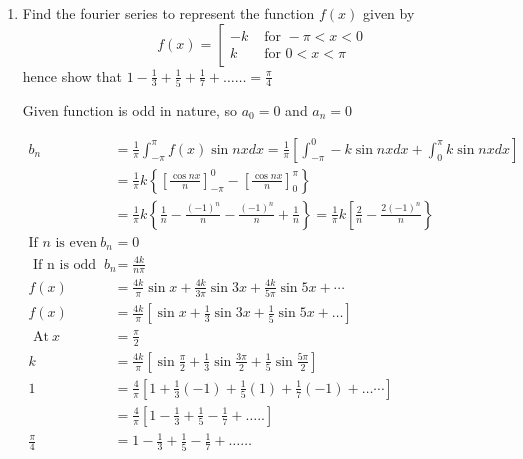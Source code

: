 \begin{enumerate}[label=\color{ocre}\textbf{\arabic*.}]
	\item  Find the fourier series to represent the function $f(x)$ given by
	$$
	f(x)=\left[\begin{array}{ll}
	-k & \text { for }-\pi<x<0 \\
	k & \text { for } 0<x<\pi
	\end{array}\right.
	$$
	hence show that $1-\frac{1}{3}+\frac{1}{5}+\frac{1}{7}+\ldots \ldots=\frac{\pi}{4}$
	\begin{answer}
		Given function is odd in nature, so $a_{0}=0$ and $a_{n}=0$
		
		\begin{align*}
		b_{n} &=\frac{1}{\pi} \int_{-\pi}^{\pi} f(x) \sin n x d x=\frac{1}{\pi}\left[\int_{-\pi}^{0}-k \sin n x d x+\int_{0}^{\pi} k \sin n x d x\right] \\
		&=\frac{1}{\pi} k\left\lbrace \left[ \frac{\cos n x}{n}\right] _{-\pi}^{0}-\left[ \frac{\cos n x}{n}\right] _{0}^{\pi}\right\rbrace  \\
		&=\frac{1}{\pi} k\left\lbrace \frac{1}{n}-\frac{(-1)^{n}}{n}-\frac{(-1)^{n}}{n}+\frac{1}{n}\right\rbrace =\frac{1}{\pi} k\left[\frac{2}{n}-\frac{2(-1)^{n}}{n}\right\rbrace \\
		\text{If $n$ is even}\ b_{n}&=0\\
	\text{	If $\mathrm{n}$ is odd }\ b_{n}&=\frac{4 k}{n \pi}\\
	f(x)&=\frac{4 k}{\pi} \sin x+\frac{4 k}{3 \pi} \sin 3 x+\frac{4 k}{5 \pi} \sin 5 x+\cdots\\
	f(x)&=\frac{4 k}{\pi}\left[\sin x+\frac{1}{3} \sin 3 x+\frac{1}{5} \sin 5 x+\ldots\right]\\
	\text { At}\ x&=\frac{\pi}{2} \\
	k&=\frac{4 k}{\pi} \left[  \sin \frac{\pi}{2}+\frac{1}{3} \sin \frac{3 \pi}{2} +\frac{1}{5} \sin \frac{5 \pi}{2}\right]   \\
	1&=\frac{4}{\pi}\left[1+\frac{1}{3}(-1)+\frac{1}{5}(1)+\frac{1}{7}(-1)+\ldots \cdots\right]\\&=\frac{4}{\pi}\left[1-\frac{1}{3}+\frac{1}{5}-\frac{1}{7}+\ldots . .\right] \\ \frac{\pi}{4}&=1-\frac{1}{3}+\frac{1}{5}-\frac{1}{7}+\ldots \ldots
		\end{align*}
	
		
	\end{answer} 


\end{enumerate}
